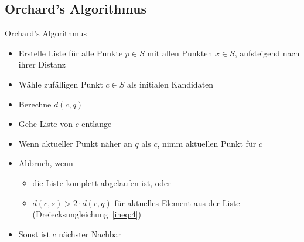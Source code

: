 \documentclass{beamer}
\begin{document}
\subsection{Orchard’s Algorithmus}
\begin{frame}{Orchard’s Algorithmus}
 \begin{itemize}
  \item Erstelle Liste f\"ur alle Punkte $p \in S$ mit allen Punkten $x \in S$, aufsteigend nach ihrer Distanz
  \pause
  \item W\"ahle zufälligen Punkt $c \in S$ als initialen Kandidaten
  \pause
  \item Berechne $d(c, q)$
  \pause
  \item Gehe Liste von $c$ entlange
  \pause
  \item Wenn aktueller Punkt näher an $q$ als $c$, nimm aktuellen Punkt für $c$
  \pause
  \item Abbruch, wenn
    \begin{itemize}
      \item die Liste komplett abgelaufen ist, oder
      \item $d(c, s) > 2 \cdot d(c, q)$ f\"ur aktuelles Element aus der Liste (Dreiecksungleichung~\ref{ineq:4})
    \end{itemize}
   \pause
   \item Sonst ist $c$ nächster Nachbar
 \end{itemize}
\end{frame}
\end{document}
